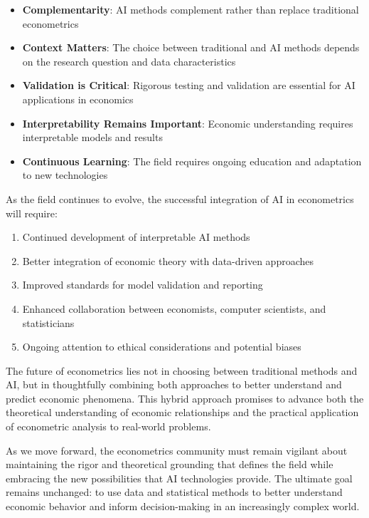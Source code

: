 \documentclass[12pt,a4paper]{article}
\begin{document}
\begin{itemize}
    \item \textbf{Complementarity}: AI methods complement rather than replace traditional econometrics
    \item \textbf{Context Matters}: The choice between traditional and AI methods depends on the research question and data characteristics
    \item \textbf{Validation is Critical}: Rigorous testing and validation are essential for AI applications in economics
    \item \textbf{Interpretability Remains Important}: Economic understanding requires interpretable models and results
    \item \textbf{Continuous Learning}: The field requires ongoing education and adaptation to new technologies
\end{itemize}

As the field continues to evolve, the successful integration of AI in econometrics will require:

\begin{enumerate}
    \item Continued development of interpretable AI methods
    \item Better integration of economic theory with data-driven approaches
    \item Improved standards for model validation and reporting
    \item Enhanced collaboration between economists, computer scientists, and statisticians
    \item Ongoing attention to ethical considerations and potential biases
\end{enumerate}

The future of econometrics lies not in choosing between traditional methods and AI, but in thoughtfully combining both approaches to better understand and predict economic phenomena. This hybrid approach promises to advance both the theoretical understanding of economic relationships and the practical application of econometric analysis to real-world problems.

As we move forward, the econometrics community must remain vigilant about maintaining the rigor and theoretical grounding that defines the field while embracing the new possibilities that AI technologies provide. The ultimate goal remains unchanged: to use data and statistical methods to better understand economic behavior and inform decision-making in an increasingly complex world.
\end{document}
